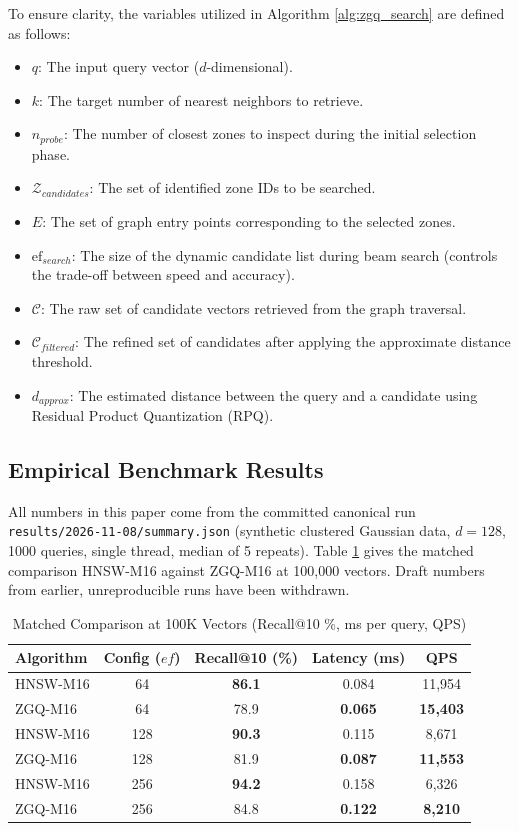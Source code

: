 \documentclass[conference]{IEEEtran}
\begin{document}
To ensure clarity, the variables utilized in Algorithm \ref{alg:zgq_search} are defined as follows:
\begin{itemize}
    \item $q$: The input query vector ($d$-dimensional).
    \item $k$: The target number of nearest neighbors to retrieve.
    \item $n_{probe}$: The number of closest zones to inspect during the initial selection phase.
    \item $\mathcal{Z}_{candidates}$: The set of identified zone IDs to be searched.
    \item $E$: The set of graph entry points corresponding to the selected zones.
    \item $\text{ef}_{search}$: The size of the dynamic candidate list during beam search (controls the trade-off between speed and accuracy).
    \item $\mathcal{C}$: The raw set of candidate vectors retrieved from the graph traversal.
    \item $\mathcal{C}_{filtered}$: The refined set of candidates after applying the approximate distance threshold.
    \item $d_{approx}$: The estimated distance between the query and a candidate using Residual Product Quantization (RPQ).
\end{itemize}

\subsection{Empirical Benchmark Results}
All numbers in this paper come from the committed canonical run \texttt{results/2026-11-08/summary.json} (synthetic clustered Gaussian data, $d=128$, 1000 queries, single thread, median of 5 repeats). Table \ref{tab:benchmark_results} gives the matched comparison HNSW-M16 against ZGQ-M16 at 100,000 vectors. Draft numbers from earlier, unreproducible runs have been withdrawn.

\begin{table}[htbp]
\caption{Matched Comparison at 100K Vectors (Recall@10 \%, ms per query, QPS)}
\label{tab:benchmark_results}
\centering
\begin{tabular}{lcccc}
\toprule
\textbf{Algorithm} & \textbf{Config ($ef$)} & \textbf{Recall@10 (\%)} & \textbf{Latency (ms)} & \textbf{QPS} \\
\midrule
HNSW-M16 & 64 & \textbf{86.1} & 0.084 & 11,954 \\
ZGQ-M16 & 64 & 78.9 & \textbf{0.065} & \textbf{15,403} \\
\midrule
HNSW-M16 & 128 & \textbf{90.3} & 0.115 & 8,671 \\
ZGQ-M16 & 128 & 81.9 & \textbf{0.087} & \textbf{11,553} \\
\midrule
HNSW-M16 & 256 & \textbf{94.2} & 0.158 & 6,326 \\
ZGQ-M16 & 256 & 84.8 & \textbf{0.122} & \textbf{8,210} \\
\bottomrule
\end{tabular}
\end{table}
\end{document}
